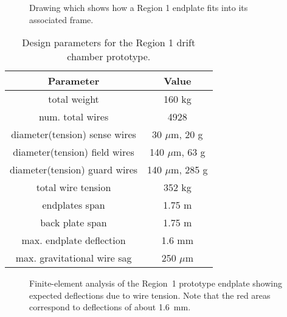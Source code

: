 \documentclass[12pt]{article}
\begin{document}
\begin{figure}[htbp]
\vspace{9.0cm}
\caption{\small{Drawing which shows how a Region 1 endplate fits into its 
associated frame.}}
\label{frame}
\end{figure}

\begin{table}[htbp]
\begin{center}
\begin{tabular} {||c|c||} \hline \hline
{\bf Parameter}      &  {\bf Value} \\ \hline
total weight   & 160 kg \\ \hline
num. total wires & 4928 \\ \hline
diameter(tension) sense wires & 30 $\mu$m, 20 g \\ \hline
diameter(tension) field wires & 140 $\mu$m, 63 g \\ \hline
diameter(tension) guard wires & 140 $\mu$m, 285 g \\ \hline
total wire tension & 352 kg   \\ \hline
endplates span & 1.75 m \\ \hline
back plate span & 1.75 m \\ \hline
max. endplate deflection & 1.6 mm \\ \hline
max. gravitational wire sag & 250 $\mu$m \\ \hline \hline
\end{tabular}
\caption{\small{Design parameters for the Region 1 drift chamber prototype.}}
\label{reg1-design-parms}
\end{center}
\end{table}

\begin{figure}[htbp]
\vspace{9.5cm}
\caption{\small{Finite-element analysis of the Region~1 prototype endplate
showing expected deflections due to wire tension.  Note that the red
areas correspond to deflections of about 1.6~mm.}}
\label{reg1fea}
\end{figure}
\end{document}
